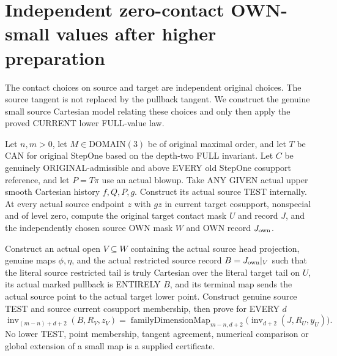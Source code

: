 \section{Independent zero-contact OWN-small values after higher preparation}

The contact choices on source and target are independent original choices.
The source tangent is not replaced by the pullback tangent. We construct
the genuine small source Cartesian model relating these choices and only
then apply the proved CURRENT lower FULL-value law.

\begin{theorem}
\label{hir:original-prepared-bound-three-zero-own-small-full-values}
\leanok
Let $n,m>0$, let $M\in\mathrm{DOMAIN}(3)$ be of original maximal order,
and let $T$ be CAN for original StepOne based on the depth-two FULL
invariant. Let $C$ be genuinely ORIGINAL-admissible and above EVERY
old StepOne cosupport reference, and let $P=T\pi$ use an actual blowup.
Take ANY GIVEN actual upper smooth Cartesian history $f,Q,P,g$.
Construct its actual source TEST internally. At every actual source
endpoint $z$ with $gz$ in current target cosupport, nonspecial and of
level zero, compute the original target contact mask $U$ and record $J$,
and the independently chosen source OWN mask $W$ and OWN record $J_{\rm own}$.

Construct an actual open $V\subseteq W$ containing the actual source
head projection, genuine maps $\phi,\eta$, and the actual restricted
source record $B=J_{\rm own}|_V$ such that the literal source restricted
tail is truly Cartesian over the literal target tail on $U$, its actual
marked pullback is ENTIRELY $B$, and its terminal map sends the actual
source point to the actual target lower point. Construct genuine source
TEST and source current cosupport membership, then prove for EVERY $d$
\[
 \operatorname{inv}_{(m-n)+d+2}(B,R_V,z_V)
 =\operatorname{familyDimensionMap}_{m-n,d+2}
     \bigl(\operatorname{inv}_{d+2}(J,R_U,y_U)\bigr).
\]
No lower TEST, point membership, tangent agreement, numerical comparison
or global extension of a small map is a supplied certificate.
\end{theorem}
